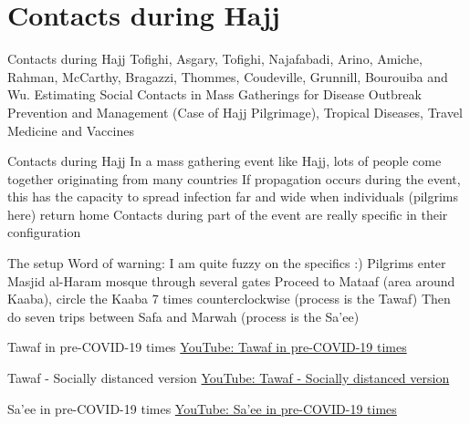 \documentclass[aspectratio=169]{beamer}\usepackage[]{graphicx}\usepackage[]{xcolor}
\begin{document}
\section{Contacts during Hajj}
\begin{frame}{Contacts during Hajj}
\bbullet Tofighi, Asgary, Tofighi, Najafabadi, Arino, Amiche, Rahman, McCarthy, Bragazzi, Thommes,  Coudeville, Grunnill, Bourouiba and Wu. Estimating Social Contacts in Mass Gatherings for Disease Outbreak Prevention and Management (Case of Hajj Pilgrimage), Tropical Diseases, Travel Medicine and Vaccines
\end{frame}

\begin{frame}{Contacts during Hajj}
\bbullet In a mass gathering event like Hajj, lots of people come together originating from many countries
\bbullet If propagation occurs during the event, this has the capacity to spread infection far and wide when individuals (pilgrims here) return home
\bbullet Contacts during part of the event are really specific in their configuration
\end{frame}

\begin{frame}{The setup}
\bbullet Word of warning: I am quite fuzzy on the specifics :)
\bbullet Pilgrims enter Masjid al-Haram mosque through several gates
\bbullet Proceed to Mataaf (area around Kaaba), circle the Kaaba 7 times counterclockwise (process is the Tawaf)
\bbullet Then do seven trips between Safa and Marwah (process is the Sa'ee)
\end{frame}


\begin{frame}{Tawaf in pre-COVID-19 times}
\bbullet \href{https://www.youtube.com/embed/L-YyR1oN66w}{YouTube: Tawaf in pre-COVID-19 times}
\end{frame}

\begin{frame}{Tawaf - Socially distanced version}
\bbullet \href{https://www.youtube.com/embed/Rl8a0wQePCo}{YouTube: Tawaf - Socially distanced version}
\end{frame}

\begin{frame}{Sa'ee in pre-COVID-19 times}
\bbullet \href{https://www.youtube.com/embed/r1qM-mHj2d0}{YouTube: Sa'ee in pre-COVID-19 times}
\end{frame}
\end{document}
